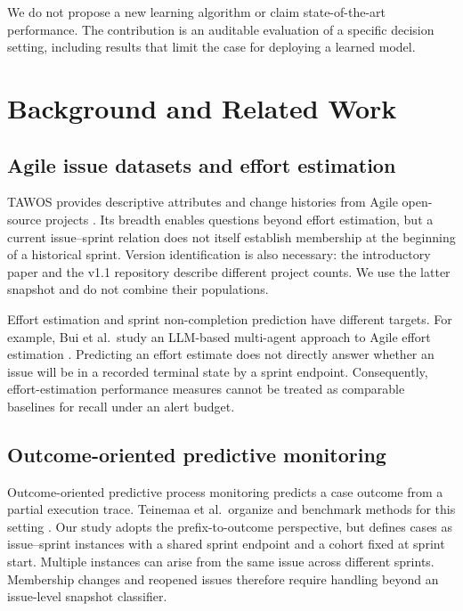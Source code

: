 \documentclass[11pt,a4paper]{article}
\begin{document}
We do not propose a new learning algorithm or claim state-of-the-art performance. The contribution is an auditable evaluation of a specific decision setting, including results that limit the case for deploying a learned model.

\section{Background and Related Work}\label{background-and-related-work}

\subsection{Agile issue datasets and effort estimation}\label{agile-issue-datasets-and-effort-estimation}

TAWOS provides descriptive attributes and change histories from Agile open-source projects \cite{tawosi2022tawos,tawosv11}. Its breadth enables questions beyond effort estimation, but a current issue--sprint relation does not itself establish membership at the beginning of a historical sprint. Version identification is also necessary: the introductory paper and the v1.1 repository describe different project counts. We use the latter snapshot and do not combine their populations.

Effort estimation and sprint non-completion prediction have different targets. For example, Bui et al.~study an LLM-based multi-agent approach to Agile effort estimation \cite{bui2025agents}. Predicting an effort estimate does not directly answer whether an issue will be in a recorded terminal state by a sprint endpoint. Consequently, effort-estimation performance measures cannot be treated as comparable baselines for recall under an alert budget.

\subsection{Outcome-oriented predictive monitoring}\label{outcome-oriented-predictive-monitoring}

Outcome-oriented predictive process monitoring predicts a case outcome from a partial execution trace. Teinemaa et al.~organize and benchmark methods for this setting \cite{teinemaa2019outcome}. Our study adopts the prefix-to-outcome perspective, but defines cases as issue--sprint instances with a shared sprint endpoint and a cohort fixed at sprint start. Multiple instances can arise from the same issue across different sprints. Membership changes and reopened issues therefore require handling beyond an issue-level snapshot classifier.
\end{document}

